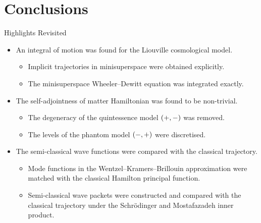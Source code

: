 \documentclass[8pt]{beamer}
\begin{document}

\section{Conclusions}

\begin{frame}%
{Highlights}%
{Revisited}
\begin{itemize}
\item An \alert{integral of motion} was found for the Liouville cosmological
model.
\begin{itemize}
\item Implicit trajectories in minisuperspace were obtained explicitly.
\item The minisuperspace Wheeler--Dewitt equation was integrated exactly.
\end{itemize}
\item The \alert{self-adjointness} of matter Hamiltonian was found to be 
non-trivial.
\begin{itemize}
\item The degeneracy of the quintessence model ${\left(+,-\right)}$ was removed.
\item The levels of the phantom model ${\left(-,+\right)}$ were discretised.
\end{itemize}
\item The \alert{semi-classical wave functions} were compared with the 
classical trajectory.
\begin{itemize}
\item Mode functions in the Wentzel--Kramers--Brillouin approximation were 
matched with the classical Hamilton principal function.
\item Semi-classical wave packets were constructed and compared with the 
classical trajectory under the Schrödinger and Mostafazadeh inner product.
\end{itemize}
\end{itemize}
\end{frame}
\end{document}
